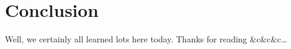 \section{Conclusion}
Well, we certainly all learned lots here today. Thanks for reading \&{}c\&{}c\&{}c\ldots{}